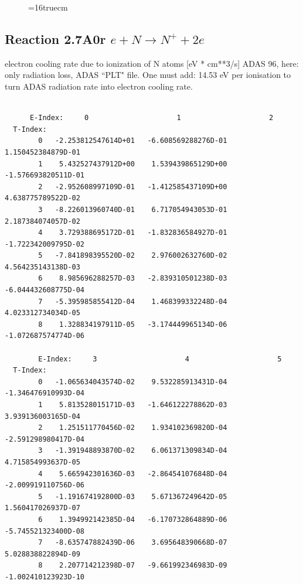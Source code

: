 \documentclass[12pt,dvipdfmx]{article}
\begin{document}
\begin{figure} \label{2.7il}
\epsfxsize=16truecm 
\end{figure}
\newpage

\subsection{
  Reaction 2.7A0r  $e + N  \rightarrow N^+   + 2e $
}
electron cooling rate due to ionization of N atoms [eV * cm**3/s]
ADAS 96, here: only radiation loss, ADAS ``PLT" file.
One must add: 14.53 eV per ionisation to turn ADAS radiation
rate into electron cooling rate.

\begin{small}\begin{verbatim}

      E-Index:     0                     1                     2
  T-Index:
        0   -2.253812547614D+01   -6.608569288276D-01    1.150452384879D-01
        1    5.432527437912D+00    1.539439865129D+00   -1.576693820511D-01
        2   -2.952608997109D-01   -1.412585437109D+00    4.638775789522D-02
        3   -8.226013960740D-01    6.717054943053D-01    2.187384074057D-02
        4    3.729388695172D-01   -1.832836584927D-01   -1.722342009795D-02
        5   -7.841898395520D-02    2.976002632760D-02    4.564235143138D-03
        6    8.985696288257D-03   -2.839310501238D-03   -6.044432608775D-04
        7   -5.395985855412D-04    1.468399332248D-04    4.023312734034D-05
        8    1.328834197911D-05   -3.174449965134D-06   -1.072687574774D-06

        E-Index:     3                     4                     5
  T-Index:
        0   -1.065634043574D-02    9.532285913431D-04   -1.346476910993D-04
        1    5.813528015171D-03   -1.646122278862D-03    3.939136003165D-04
        2    1.251511770456D-02    1.934102369820D-04   -2.591298980417D-04
        3   -1.391948893870D-02    6.061371309834D-04    4.715854993637D-05
        4    5.665942301636D-03   -2.864541076848D-04   -2.009919110756D-06
        5   -1.191674192800D-03    5.671367249642D-05    1.560417026937D-07
        6    1.394992142385D-04   -6.170732864889D-06   -5.745521323400D-08
        7   -8.635747882439D-06    3.695648390668D-07    5.028838822894D-09
        8    2.207714212398D-07   -9.661992346983D-09   -1.002410123923D-10


\end{verbatim}
\end{small}
\end{document}
